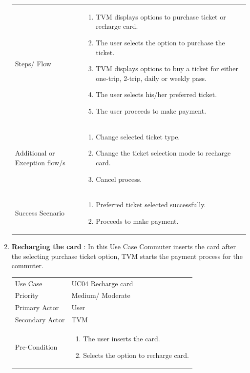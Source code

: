 \documentclass[15pt]{article}
\begin{document}
\begin{enumerate}[leftmargin=2em, itemsep=0pt, parsep=0pt, , font=\Large\bfseries]
\begin{tabularx}{1\textwidth} { 
  | >{\raggedright\arraybackslash}X 
  | >{\raggedright\arraybackslash}X 
  | }
  Steps/ Flow  & \begin{enumerate}
  \item  TVM displays options to purchase ticket or recharge card.
  \item The user selects the option to purchase the ticket.
  \item TVM displays options to buy a ticket for either one-trip, 2-trip, daily or weekly pass.
  \item  The user selects his/her preferred ticket.
  \item The user proceeds to make payment.
  \end{enumerate}
  \\
  
   Additional or Exception flow/s  & \begin{enumerate}
  \item  Change selected ticket type.
  \item  Change the ticket selection mode to recharge card.
  \item  Cancel process.
  \end{enumerate}
  \\
    
   Success Scenario  & \begin{enumerate}
  \item  Preferred ticket selected successfully.
  \item  Proceeds to make payment.
  \end{enumerate}
  \\

\hline
\end{tabularx}


\newpage
\item {\Large\bfseries{Recharging the card}} : In this Use Case Commuter inserts the card after the selecting purchase ticket option, TVM starts the payment process for the commuter.
\newline
\newline
\begin{tabularx}{1\textwidth} { 
  | >{\raggedright\arraybackslash}X 
  | >{\raggedright\arraybackslash}X 
  | }
 \hline
 Use Case &  UC04 Recharge card \\
 Priority &  Medium/ Moderate \\
 Primary Actor  & User \\
 Secondary Actor  & TVM \\

 Pre-Condition  & 
 \begin{enumerate}
  \item The user inserts the card.
  \item Selects the option to recharge card.
  \end{enumerate}
  \\
  

\end{tabularx}
\end{enumerate}
\end{document}
